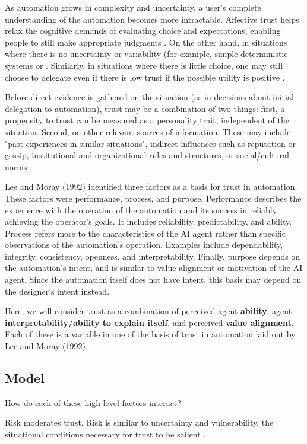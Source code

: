 \documentclass[letterpaper]{article} %
\begin{document}
As automation grows in complexity and uncertainty, a user's complete understanding of the automation becomes more intractable. Affective trust helps relax the cognitive demands of evaluating choice and expectations, enabling people to still make appropriate judgments \cite{lee}. On the other hand, in situations where there is no uncertainty or variability (for example, simple deterministic systems or . Similarly, in situations where there is little choice, one may still choose to delegate even if there is low trust if the possible utility is positive \cite{}. 

Before direct evidence is gathered on the situation (as in decisions about initial delegation to automation), trust may be a combination of two things: first, a propensity to trust can be measured as a personality trait, independent of the situation. Second, on other relevant sources of information. These may include "past experiences in similar situations", indirect influences such as reputation or gossip, institutional and organizational rules and structures, or social/cultural norms \cite{lee}.

Lee and Moray (1992) identified three factors as a basis for trust in automation. These factors were performance, process, and purpose. Performance describes the experience with the operation of the automation and its success in reliably achieving the operator's goals. It includes reliability, predictability, and ability. Process refers more to the characteristics of the AI agent rather than specific observations of the automation's operation. Examples include dependability, integrity, consistency, openness, and interpretability. Finally, purpose depends on the automation's intent, and is similar to value alignment or motivation of the AI agent. Since the automation itself does not have intent, this basis may depend on the designer's intent instead.

Here, we will consider trust as a combination of perceived agent \textbf{ability}, agent \textbf{interpretability/ability to explain itself}, and perceived \textbf{value alignment}. Each of these is a variable in one of the basis of trust in automation laid out by Lee and Moray (1992).

\subsection{Model}

How do each of these high-level factors interact?

Risk moderates trust. Risk is similar to uncertainty and vulnerability, the situational conditions necessary for trust to be salient \cite{lee}.
\end{document}
